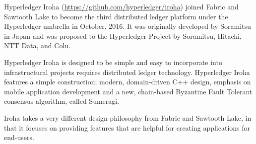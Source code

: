 Hyperledger Iroha (\url{https://github.com/hyperledger/iroha}) joined Fabric and Sawtooth Lake to become the third distributed ledger platform under the Hyperledger umbrella in October, 2016. It was originally developed by Soramitsu in Japan and was proposed to the Hyperledger Project by Soramitsu, Hitachi, NTT Data, and Colu.

Hyperledger Iroha is designed to be simple and easy to incorporate into infrastructural projects requires distributed ledger technology. Hyperledger Iroha features a simple construction; modern, domain-driven C++ design, emphasis on mobile application development and a new, chain-based Byzantine Fault Tolerant consensus algorithm, called Sumeragi. 

Iroha takes a very different design philosophy from Fabric and Sawtooth Lake, in that it focuses on providing features that are helpful for creating applications for end-users. 
